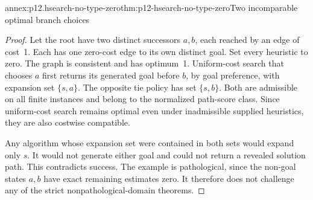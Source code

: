 \begin{annexitem}{annex:p12.hsearch-no-type-zero}{thm:p12-hsearch-no-type-zero}{Two incomparable optimal branch choices}
\begin{proof}
Let the root have two distinct successors \(a,b\), each reached by
an edge of cost~1. Each has one zero-cost edge to its own distinct goal.
Set every heuristic to zero. The graph is consistent and has optimum~1.
Uniform-cost search that chooses \(a\) first returns its generated
goal before \(b\), by goal preference, with expansion set
\(\{s,a\}\). The opposite tie policy has set \(\{s,b\}\).
Both are admissible on all finite instances and belong to the normalized
path-score class. Since uniform-cost search remains optimal even under
inadmissible supplied heuristics, they are also costwise compatible.

Any algorithm whose expansion set were contained in both sets would
expand only \(s\). It would not generate either goal and could not
return a revealed solution path. This contradicts success. The example
is pathological, since the non-goal states \(a,b\) have exact
remaining estimates zero. It therefore does not challenge any of the
strict nonpathological-domain theorems.
\end{proof}
\end{annexitem}

